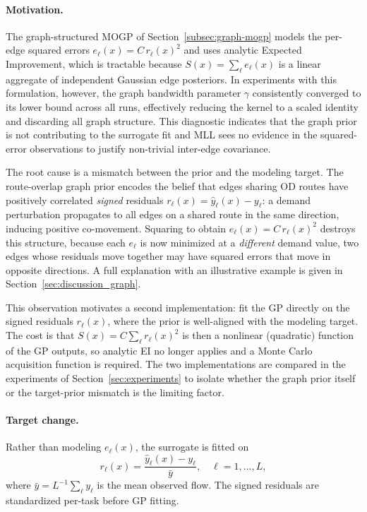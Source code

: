 \documentclass[11pt]{article}
\begin{document}
\paragraph{Motivation.}
The graph-structured MOGP of Section~\ref{subsec:graph-mogp} models the per-edge squared
errors $e_\ell(x) = C\,r_\ell(x)^2$ and uses analytic Expected Improvement, which is
tractable because $S(x) = \sum_\ell e_\ell(x)$ is a linear aggregate of independent
Gaussian edge posteriors. In experiments with this formulation, however, the graph
bandwidth parameter $\gamma$ consistently converged to its lower bound across all runs,
effectively reducing the kernel to a scaled identity and discarding all graph structure.
This diagnostic indicates that the graph prior is not contributing to the surrogate fit and
MLL sees no evidence in the squared-error observations to justify non-trivial inter-edge
covariance.

The root cause is a mismatch between the prior and the modeling target. The route-overlap
graph prior encodes the belief that edges sharing OD routes have positively correlated
\emph{signed} residuals $r_\ell(x) = \hat{y}_\ell(x) - y_\ell$: a demand perturbation
propagates to all edges on a shared route in the same direction, inducing positive
co-movement. Squaring to obtain $e_\ell(x) = C\,r_\ell(x)^2$ destroys this structure,
because each $e_\ell$ is now minimized at a \emph{different} demand value, two edges
whose residuals move together may have squared errors that move in opposite directions.
A full explanation with an illustrative example is given in Section~\ref{sec:discussion_graph}.

This observation motivates a second implementation: fit the GP directly on the signed
residuals $r_\ell(x)$, where the prior is well-aligned with the modeling target. The
cost is that $S(x) = C\sum_\ell r_\ell(x)^2$ is then a nonlinear (quadratic) function
of the GP outputs, so analytic EI no longer applies and a Monte Carlo acquisition
function is required. The two implementations are compared in the experiments of
Section~\ref{sec:experiments} to isolate whether the graph prior itself or the
target-prior mismatch is the limiting factor.

\paragraph{Target change.}
Rather than modeling $e_\ell(x)$, the surrogate is fitted on
\begin{equation}
  r_\ell(x) = \frac{\hat{y}_\ell(x) - y_\ell}{\bar{y}}, \quad \ell = 1, \ldots, L,
  \label{eq:signed-resid}
\end{equation}
where $\bar{y} = L^{-1}\sum_\ell y_\ell$ is the mean observed flow. The signed residuals
are standardized per-task before GP fitting.
\end{document}

